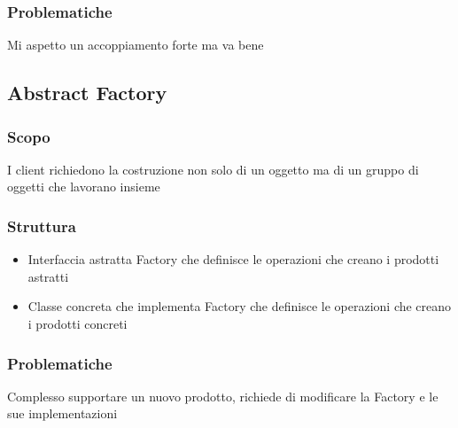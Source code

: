 \subsubsection{Problematiche}
Mi aspetto un accoppiamento forte ma va bene

\subsection{Abstract Factory}
\subsubsection{Scopo}
I client richiedono la costruzione non solo di un oggetto ma di un gruppo di oggetti che lavorano insieme
\subsubsection{Struttura}
\begin{itemize}
    \item Interfaccia astratta Factory che definisce le operazioni che creano i prodotti astratti
    \item Classe concreta che implementa Factory che definisce le operazioni che creano i prodotti concreti
\end{itemize}
\subsubsection{Problematiche}
Complesso supportare un nuovo prodotto, richiede di modificare la Factory e le sue implementazioni